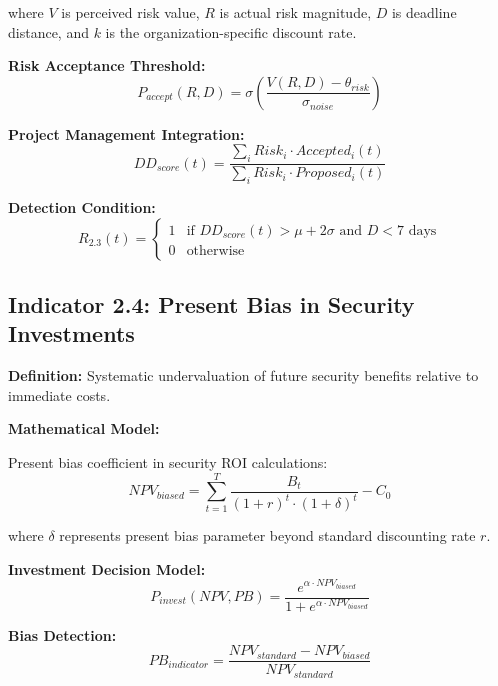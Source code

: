 \documentclass[11pt,a4paper]{article}
\begin{document}
where $V$ is perceived risk value, $R$ is actual risk magnitude, $D$ is deadline distance, and $k$ is the organization-specific discount rate.

\textbf{Risk Acceptance Threshold:}
\begin{equation}
P_{accept}(R,D) = \sigma\left(\frac{V(R,D) - \theta_{risk}}{\sigma_{noise}}\right)
\end{equation}

\textbf{Project Management Integration:}
\begin{equation}
DD_{score}(t) = \frac{\sum_{i} Risk_i \cdot Accepted_i(t)}{\sum_{i} Risk_i \cdot Proposed_i(t)}
\end{equation}

\textbf{Detection Condition:}
\begin{equation}
R_{2.3}(t) = \begin{cases}
1 & \text{if } DD_{score}(t) > \mu + 2\sigma \text{ and } D < 7 \text{ days} \\
0 & \text{otherwise}
\end{cases}
\end{equation}

\subsection{Indicator 2.4: Present Bias in Security Investments}

\textbf{Definition:} Systematic undervaluation of future security benefits relative to immediate costs.

\textbf{Mathematical Model:}

Present bias coefficient in security ROI calculations:
\begin{equation}
NPV_{biased} = \sum_{t=1}^{T} \frac{B_t}{(1+r)^t \cdot (1+\delta)^t} - C_0
\end{equation}

where $\delta$ represents present bias parameter beyond standard discounting rate $r$.

\textbf{Investment Decision Model:}
\begin{equation}
P_{invest}(NPV,PB) = \frac{e^{\alpha \cdot NPV_{biased}}}{1 + e^{\alpha \cdot NPV_{biased}}}
\end{equation}

\textbf{Bias Detection:}
\begin{equation}
PB_{indicator} = \frac{NPV_{standard} - NPV_{biased}}{NPV_{standard}}
\end{equation}
\end{document}
